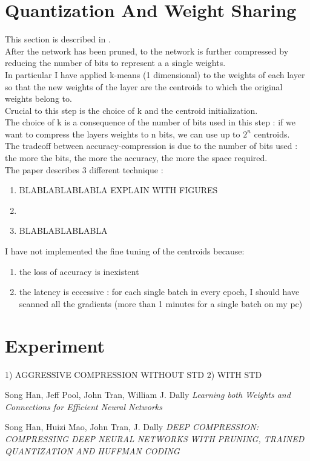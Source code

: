 \documentclass[journal]{vgtc}                %
\begin{document}
\section{Quantization And Weight Sharing}
This section is described in \cite{p2}.\\After the network has been pruned, to the network is further compressed by reducing the number of bits to represent a a single weights.\\In particular I have applied k-means (1 dimensional) to the weights of each layer so that the new weights of the layer are the centroids to which the original weights belong to.\\Crucial to this step is the choice of k and the centroid initialization.\\The choice of k is a consequence of the number of bits used in this step : if we want to compress the layers weights to n bits, we can use up to $2^{n}$ centroids.\\The tradeoff between accuracy-compression is due to the number of bits used : the more the bits, the more the accuracy, the more the space required.\\The paper describes 3 different technique :
\begin{enumerate}
\item BLABLABLABLABLA EXPLAIN WITH FIGURES
\item 
\item BLABLABLABLABLA
\end{enumerate}
I have not implemented the fine tuning of the centroids because:
\begin{enumerate}
\item the loss of accuracy is inexistent
\item the latency is eccessive : for each single batch in every epoch, I should have scanned all the gradients (more than 1 minutes for a single batch on my pc) 
\end{enumerate}
\section{Experiment}
1) AGGRESSIVE COMPRESSION WITHOUT STD
2) WITH STD


\begin{thebibliography}{2}

  Song Han, Jeff Pool, John Tran, William J. Dally
  \textit{Learning both Weights and Connections for Efficient Neural Networks}
  
  Song Han, Huizi Mao, John Tran, J. Dally
  \textit{DEEP COMPRESSION: COMPRESSING DEEP NEURAL NETWORKS WITH PRUNING, TRAINED QUANTIZATION AND HUFFMAN CODING}



\end{thebibliography}
\end{document}
